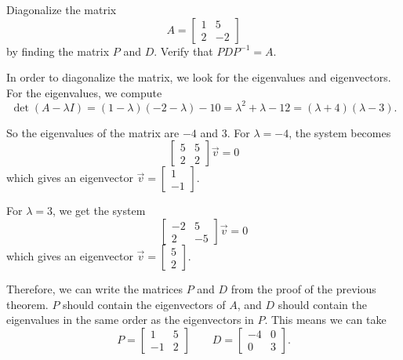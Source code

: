 \documentclass{ximera}
\begin{document}
\begin{example}
    Diagonalize the matrix 
    \[ 
        A = 
        \begin{bmatrix} 
            1 & 5 \\ 
            2 & -2 
        \end{bmatrix} 
    \] 
    by finding the matrix $P$ and $D$. Verify that $PDP^{-1} = A$. 
\end{example}

\begin{exampleSol}
    In order to diagonalize the matrix, we look for the eigenvalues and eigenvectors. For the eigenvalues, we compute
    \[ 
        \det(A - \lambda I) = (1-\lambda)(-2-\lambda) - 10 = \lambda^2 + \lambda - 12 = (\lambda +4)(\lambda - 3). 
    \]
    
    So the eigenvalues of the matrix are $-4$ and $3$. For $\lambda = -4$, the system becomes
    \[ 
        \begin{bmatrix} 
            5 & 5 \\ 
            2 & 2 
        \end{bmatrix} \vec{v} = 0 
    \] 
    which gives an eigenvector 
    $\vec{v} = \begin{bmatrix} 1 \\ -1 \end{bmatrix}$. 
    
    For $\lambda = 3$, we get the system
    \[ 
        \begin{bmatrix} 
            -2 & 5 \\ 
            2 & -5 
        \end{bmatrix}\vec{v} = 0 
    \] 
    which gives an eigenvector 
    $\vec{v} = \begin{bmatrix} 5 \\ 2 \end{bmatrix}.$
    
    Therefore, we can write the matrices $P$ and $D$ from the proof of the previous theorem. $P$ should contain the eigenvectors of $A$, and $D$ should contain the eigenvalues in the same order as the eigenvectors in $P$. This means we can take
    \[ 
        P = 
        \begin{bmatrix} 
            1 & 5 \\ 
            -1 & 2 
        \end{bmatrix} 
        \qquad D = 
        \begin{bmatrix} 
            -4 & 0 \\ 
            0 & 3 
        \end{bmatrix}.
    \]
    

\end{exampleSol}
\end{document}
